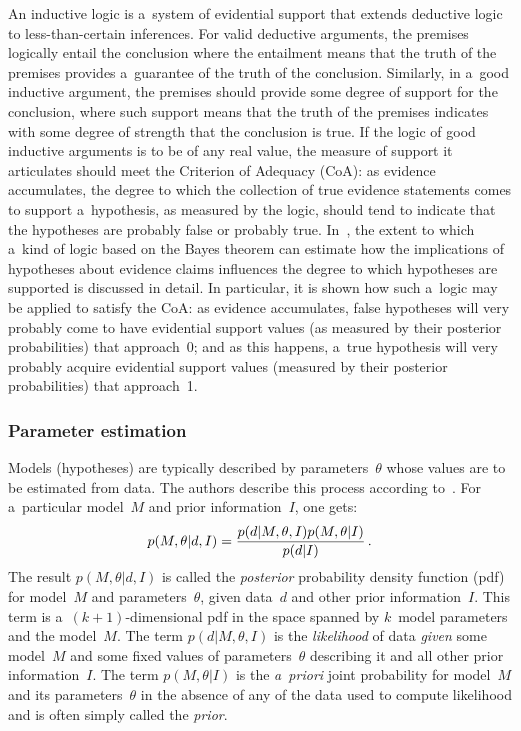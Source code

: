 \begin{multicols}{2}
  An inductive logic is a~system of evidential support that extends deductive
  logic to less-than-certain inferences.  For valid deductive arguments, the
  premises logically
entail the conclusion where the entailment means that the truth of the premises
provides a~guarantee of the truth of the conclusion. Similarly, in a~good
inductive argument, the premises should provide some degree of support for the conclusion,
where such support means that the truth of the premises indicates with some degree of strength that the conclusion is true. If the logic of good inductive arguments is to be of any real value, the measure of support it articulates should meet the Criterion of
Adequacy (CoA): as evidence accumulates, the degree to which the collection of true evidence statements comes to support a~hypothesis, as measured by the logic, should
tend to indicate that the hypotheses are probably false or probably true.
  In~\cite{35-kl}, the extent to which a~kind of logic based on the Bayes theorem
can estimate how the implications of hypotheses about evidence claims influences the degree to which hypotheses are supported is discussed in detail. In particular, it is
shown how such a~logic may be applied to satisfy the CoA: as evidence accumulates, false hypotheses will very probably come to have evidential support values (as
measured by their posterior probabilities) that approach~0; and as this happens, a~true hypothesis will very probably acquire evidential support values (measured by
their posterior probabilities) that approach~1.

\vspace*{-8pt}

\subsubsection{Parameter estimation }


  \noindent
  Models (hypotheses) are typically described by parameters~$\theta$  whose
  values are to be estimated from data. The authors describe this process according
  to~\cite{27-kl}.
For a~particular model~$M$ and prior information~$I$, one gets:
  $$
  p(M, \theta\vert d, I) =
  \displaystyle\frac{\displaystyle p(d\vert M, \theta, I) p(M, \theta\vert I)\mathstrut}{\displaystyle p(d\vert I)\mathstrut}\,.
  $$
  The result $p(M, \theta\vert d, I)$ is called the \textit{posterior} probability density
function (pdf) for model~$M$ and parameters~$\theta$, given data~$d$ and other
prior information~$I$. This term is a~$(k + 1)$-dimensional pdf in the space spanned
by $k$~model parameters and the model~$M$. The term $p(d\vert M, \theta, I)$ is
the \textit{likelihood} of data \textit{given} some model~$M$ and some fixed values of parameters~$\theta$
describing it and all other prior information~$I$. The term
$p(M, \theta\vert I)$ is the \textit{a~priori} joint probability for model~$M$ and its
parameters~$\theta$ in the absence of any of the data used to compute likelihood
and is often simply called the \textit{prior}.


\end{multicols}
